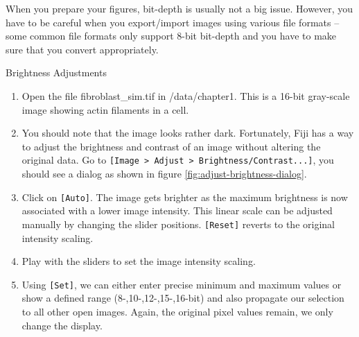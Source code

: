 When you prepare your figures, bit-depth is usually not a big issue. However, you have to be careful when you export/import images using various file formats -- some common file formats only support 8-bit bit-depth and you have to make sure that you convert appropriately.

\newpage
\begin{taskbox}{Brightness Adjustments}
\begin{enumerate}
	\item Open the file fibroblast\_sim.tif in /data/chapter1. This is a 16-bit gray-scale image showing actin filaments in a cell. 
	\item You should note that the image looks rather dark. Fortunately, Fiji has a way to adjust the brightness and contrast of an image without altering the original data. Go to \texttt{[Image > Adjust > Brightness/Contrast...]}, you should see a dialog as shown in figure \ref{fig:adjust-brightness-dialog}.
	
	\begin{minipage}[t]{\linewidth}
		\begin{center}
		\medskip
		\label{fig:adjust-brightness-dialog}
		\end{center}
	\end{minipage}
	
	\item Click on \texttt{[Auto]}. The image gets brighter as the maximum brightness is now associated with a lower image intensity. This linear scale can be adjusted manually by changing the slider positions. \texttt{[Reset]} reverts to the original intensity scaling. 
	\item Play with the sliders to set the image intensity scaling. 
	\item Using \texttt{[Set]}, we can either enter precise minimum and maximum values or show a defined range (8-,10-,12-,15-,16-bit) and also propagate our selection to all other open images. Again, the original pixel values remain, we only change the display.
\end{enumerate}

\end{taskbox}


